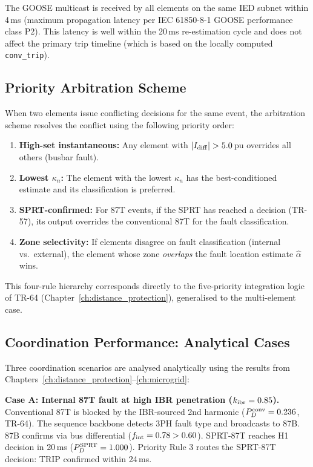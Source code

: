 The GOOSE multicast is received by all elements on the same IED subnet
within 4\,ms (maximum propagation latency per IEC 61850-8-1 GOOSE
performance class P2).  This latency is well within the 20\,ms re-estimation
cycle and does not affect the primary trip timeline (which is based on the
locally computed \texttt{conv\_trip}).

\subsection{Priority Arbitration Scheme}

When two elements issue conflicting decisions for the same event, the
arbitration scheme resolves the conflict using the following priority order:
\begin{enumerate}
  \item \textbf{High-set instantaneous:} Any element with
    $|I_{\rm diff}| > 5.0$\,pu overrides all others (busbar fault).
  \item \textbf{Lowest $\kappa_n$:} The element with the lowest $\kappa_n$
    has the best-conditioned estimate and its classification is preferred.
  \item \textbf{SPRT-confirmed:} For 87T events, if the SPRT has reached
    a decision (TR-57), its output overrides the conventional 87T for
    the fault classification.
  \item \textbf{Zone selectivity:} If elements disagree on fault
    classification (internal vs.\ external), the element whose zone
    \emph{overlaps} the fault location estimate $\hat{\alpha}$ wins.
\end{enumerate}

This four-rule hierarchy corresponds directly to the five-priority
integration logic of TR-64 (Chapter~\ref{ch:distance_protection}),
generalised to the multi-element case.

\subsection{Coordination Performance: Analytical Cases}

Three coordination scenarios are analysed analytically using the results
from Chapters~\ref{ch:distance_protection}--\ref{ch:microgrid}:

\textbf{Case A: Internal 87T fault at high IBR penetration
($k_{\rm ibr} = 0.85$).}
Conventional 87T is blocked by the IBR-sourced 2nd harmonic
($P_D^{\rm conv} = 0.236$, TR-64).
The sequence backbone detects 3PH fault type and broadcasts to 87B.
87B confirms via bus differential ($f_{\rm int} = 0.78 > 0.60$).
SPRT-87T reaches H1 decision in 20\,ms ($P_D^{\rm SPRT} = 1.000$).
Priority Rule 3 routes the SPRT-87T decision: TRIP confirmed within 24\,ms.

